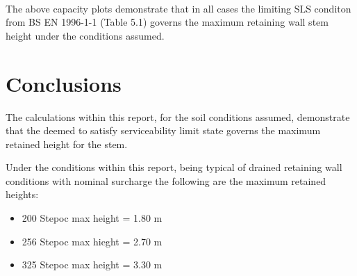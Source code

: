 \documentclass[11pt]{article}
\providecommand{\tightlist}{%
      \setlength{\itemsep}{0pt}\setlength{\parskip}{0pt}}
\begin{document}
    \begin{center}
    \end{center}
    { \hspace*{\fill} \\}
    
    The above capacity plots demonstrate that in all cases the limiting SLS
conditon from BS EN 1996-1-1 (Table 5.1) governs the maximum retaining
wall stem height under the conditions assumed.

    \hypertarget{conclusions}{%
\section{Conclusions}\label{conclusions}}

The calculations within this report, for the soil conditions assumed,
demonstrate that the deemed to satisfy serviceability limit state
governs the maximum retained height for the stem.

Under the conditions within this report, being typical of drained
retaining wall conditions with nominal surcharge the following are the
maximum retained heights:

\begin{itemize}
\tightlist
\item
  200 Stepoc max height = 1.80 m
\item
  256 Stepoc max hieght = 2.70 m
\item
  325 Stepoc max height = 3.30 m
\end{itemize}


    
    
    
\end{document}
